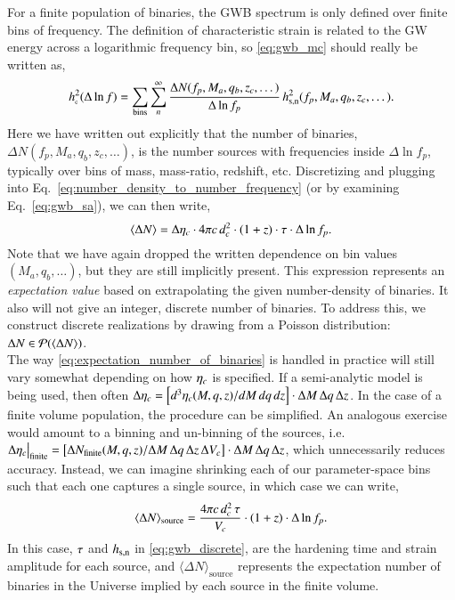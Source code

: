 \documentclass[useAMS, usenatbib]{mnras}
\begin{document}
        For a finite population of binaries, the GWB spectrum is only defined over finite bins of frequency.  The definition of characteristic strain is related to the GW energy across a logarithmic frequency bin, so \eqref{eq:gwb_mc} should really be written as,
        \begin{equation}
            \label{eq:gwb_discrete}
            \hc^2(\Delta \ln f) = \sum_\textrm{bins} \sum_n^\infty \frac{\Delta N(f_p,M_a,q_b,z_c,\dots)}{\Delta \ln f_p} \, \hsn^2(f_p,M_a,q_b,z_c,\dots).
        \end{equation}
        Here we have written out explicitly that the number of binaries, $\Delta N(f_p,M_a,q_b,z_c,\dots)$, is the number sources with frequencies inside $\Delta \ln f_p$, typically over bins of mass, mass-ratio, redshift, etc.  Discretizing and plugging into Eq.~\ref{eq:number_density_to_number_frequency} (or by examining Eq.~\ref{eq:gwb_sa}), we can then write,
        \begin{equation}
            \label{eq:expectation_number_of_binaries}
            \langle \Delta N \rangle = \Delta \eta_c \cdot 4\pi c \, d_c^2 \cdot (1+z) \cdot \tau \cdot \Delta \ln f_p.
        \end{equation}
        Note that we have again dropped the written dependence on bin values $(M_a, q_b, \dots)$, but they are still implicitly present.  This expression represents an \textit{expectation value} based on extrapolating the given number-density of binaries.  It also will not give an integer, discrete number of binaries.  To address this, we construct discrete realizations by drawing from a Poisson distribution: $\Delta N \in \mathcal{P}(\langle \Delta N \rangle)$. \\

        The way \eqref{eq:expectation_number_of_binaries} is handled in practice will still vary somewhat depending on how $\eta_c$ is specified.  If a semi-analytic model is being used, then often
        $\Delta \eta_c = \left[ d^3 \eta_c(M,q,z) / dM \, dq \, dz \right] \cdot \Delta M \, \Delta q \, \Delta z$.  In the case of a finite volume population, the procedure can be simplified.  An analogous exercise would amount to a binning and un-binning of the sources, i.e.~$\Delta \eta_c \big|_\textrm{finite} = \left[ \Delta N_\textrm{finite}(M,q,z) / \Delta M \, \Delta q \, \Delta z \, \Delta V_c \right] \cdot \Delta M \, \Delta q \, \Delta z$, which unnecessarily reduces accuracy.  Instead, we can imagine shrinking each of our parameter-space bins such that each one captures a single source, in which case we can write,
        \begin{equation}
            \label{eq:expectation_number_of_single_binary}
            \langle \Delta N \rangle_\textrm{source} = \frac{4\pi c \, d_c^2 \, \tau}{V_c} \cdot (1+z) \cdot \Delta \ln f_p.
        \end{equation}
        In this case, $\tau$ and $h_{\textrm{s,n}}$ in \eqref{eq:gwb_discrete}, are the hardening time and strain amplitude for each source, and $\langle \Delta N \rangle_\textrm{source}$ represents the expectation number of binaries in the Universe implied by each source in the finite volume.
\end{document}
